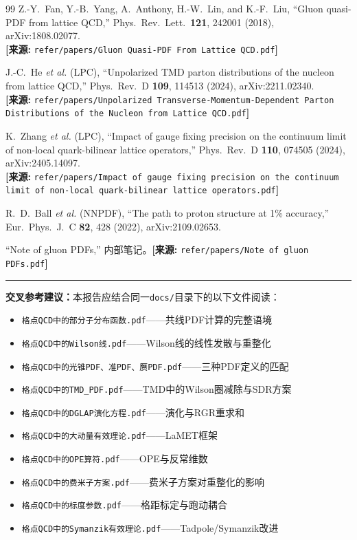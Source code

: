 \documentclass[12pt,a4paper]{ctexart}
\theoremstyle{definition}
\begin{document}
\begin{thebibliography}{99}
Z.-Y.~Fan, Y.-B.~Yang, A.~Anthony, H.-W.~Lin, and K.-F.~Liu,
``Gluon quasi-PDF from lattice QCD,''
Phys.\ Rev.\ Lett.\ \textbf{121}, 242001 (2018), arXiv:1808.02077.
\\\textbf{[来源:} \texttt{refer/papers/Gluon Quasi-PDF From Lattice QCD.pdf}\textbf{]}

J.-C.~He \textit{et al.} (LPC),
``Unpolarized TMD parton distributions of the nucleon from lattice QCD,''
Phys.\ Rev.\ D \textbf{109}, 114513 (2024), arXiv:2211.02340.
\\\textbf{[来源:} \texttt{refer/papers/Unpolarized Transverse-Momentum-Dependent Parton Distributions of the Nucleon from Lattice QCD.pdf}\textbf{]}

K.~Zhang \textit{et al.} (LPC),
``Impact of gauge fixing precision on the continuum limit of non-local quark-bilinear lattice operators,''
Phys.\ Rev.\ D \textbf{110}, 074505 (2024), arXiv:2405.14097.
\\\textbf{[来源:} \texttt{refer/papers/Impact of gauge fixing precision on the continuum limit of non-local quark-bilinear lattice operators.pdf}\textbf{]}

R.~D.~Ball \textit{et al.} (NNPDF),
``The path to proton structure at 1\% accuracy,''
Eur.\ Phys.\ J.\ C \textbf{82}, 428 (2022), arXiv:2109.02653.

``Note of gluon PDFs,'' 内部笔记。\textbf{[来源:} \texttt{refer/papers/Note of gluon PDFs.pdf}\textbf{]}

\end{thebibliography}

\vspace{0.5cm}
\noindent\rule{\textwidth}{0.5pt}
\small
\textbf{交叉参考建议：}本报告应结合同一\texttt{docs/}目录下的以下文件阅读：
\begin{itemize}[nosep]
    \item \texttt{格点QCD中的部分子分布函数.pdf}——共线PDF计算的完整语境
    \item \texttt{格点QCD中的Wilson线.pdf}——Wilson线的线性发散与重整化
    \item \texttt{格点QCD中的光锥PDF、准PDF、赝PDF.pdf}——三种PDF定义的匹配
    \item \texttt{格点QCD中的TMD\_PDF.pdf}——TMD中的Wilson圈减除与SDR方案
    \item \texttt{格点QCD中的DGLAP演化方程.pdf}——演化与RGR重求和
    \item \texttt{格点QCD中的大动量有效理论.pdf}——LaMET框架
    \item \texttt{格点QCD中的OPE算符.pdf}——OPE与反常维数
    \item \texttt{格点QCD中的费米子方案.pdf}——费米子方案对重整化的影响
    \item \texttt{格点QCD中的标度参数.pdf}——格距标定与跑动耦合
    \item \texttt{格点QCD中的Symanzik有效理论.pdf}——Tadpole/Symanzik改进
\end{itemize}
\end{document}
